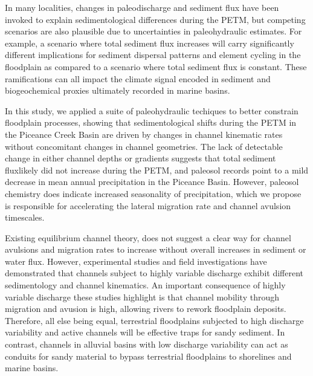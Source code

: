 \documentclass[draft]{compact_proposal}\usepackage[]{graphicx}\usepackage[]{color}
\begin{document}
In many localities, changes in paleodischarge and sediment flux have been invoked to explain sedimentological differences during the PETM, but competing scenarios are also plausible due to uncertainties in paleohydraulic estimates.
For example, a scenario where total sediment flux increases will carry significantly different implications for sediment dispersal patterns and element cycling in the floodplain as compared to a scenario where total sediment flux is constant. 
These ramifications can all impact the climate signal encoded in sediment and biogeochemical proxies ultimately recorded in marine basins.

In this study, we applied a suite of paleohydraulic techiques to better constrain floodplain processes, showing that sedimentological shifts during the PETM in the Piceance Creek Basin are driven by changes in channel kinematic rates without concomitant changes in channel geometries.
The lack of detectable change in either channel depths or gradients suggests that total sediment fluxlikely did not increase during the PETM, and paleosol records point to a mild decrease in mean annual precipitation in the Piceance Basin.
However, paleosol chemistry does indicate increased seasonality of precipitation, which we propose is responsible for accelerating the lateral migration rate and channel avulsion timescales.

Existing equilibrium channel theory, does not suggest a clear way for channel avulsions and migration rates to increase without overall increases in sediment or water flux. 
However, experimental studies and field investigations have demonstrated that channels subject to highly variable discharge exhibit different sedimentology and channel kinematics.
An important consequence of highly variable discharge these studies highlight is that channel mobility through migration and avusion is high, allowing rivers to rework floodplain deposits.
Therefore, all else being equal, terrestrial floodplains subjected to high discharge variability and active channels will be effective traps for sandy sediment.
In contrast, channels in alluvial basins with low discharge variability can act as conduits for sandy material to bypass terrestrial floodplains to shorelines and marine basins. 
\end{document}

